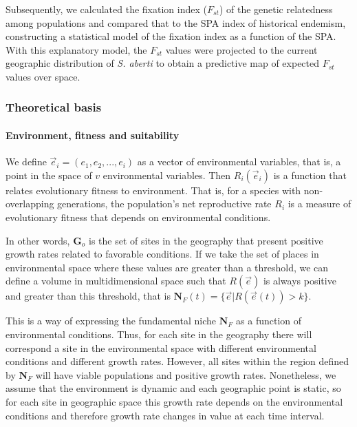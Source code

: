 \documentclass[
]{article}
\begin{document}
Subsequently, we calculated the fixation index (\(F_{st}\)) of the
genetic relatedness among populations and compared that to the SPA index
of historical endemism, constructing a statistical model of the fixation
index as a function of the SPA. With this explanatory model, the
\(F_{st}\) values were projected to the current geographic distribution
of \textit{S. aberti} to obtain a predictive map of expected \(F_{st}\)
values over space.

\hypertarget{theoretical-basis}{%
\subsubsection{Theoretical basis}\label{theoretical-basis}}

\hypertarget{environment-fitness-and-suitability}{%
\paragraph{Environment, fitness and
suitability}\label{environment-fitness-and-suitability}}

We define \(\vec{e}_i =(e_1, e_2, ..., e_i )\) as a vector of
environmental variables, that is, a point in the space of \(v\)
environmental variables. Then \(R_i(\vec{e}_i)\) is a function that
relates evolutionary fitness to environment. That is, for a species with
non-overlapping generations, the population's net reproductive rate
\(R_i\) is a measure of evolutionary fitness that depends on
environmental conditions.

In other words, \(\mathbf{G}_o\) is the set of sites in the geography
that present positive growth rates related to favorable conditions. If
we take the set of places in environmental space where these values are
greater than a threshold, we can define a volume in multidimensional
space such that \(R(\vec{e})\) is always positive and greater than this
threshold, that is
\(\mathbf{N}_F(t) = \{\vec{e} | R(\vec{e}(t)) > k \}\).

This is a way of expressing the fundamental niche \(\mathbf{N}_F\) as a
function of environmental conditions. Thus, for each site in the
geography there will correspond a site in the environmental space with
different environmental conditions and different growth rates. However,
all sites within the region defined by \(\mathbf{N}_F\) will have viable
populations and positive growth rates. Nonetheless, we assume that the
environment is dynamic and each geographic point is static, so for each
site in geographic space this growth rate depends on the environmental
conditions and therefore growth rate changes in value at each time
interval.
\end{document}
